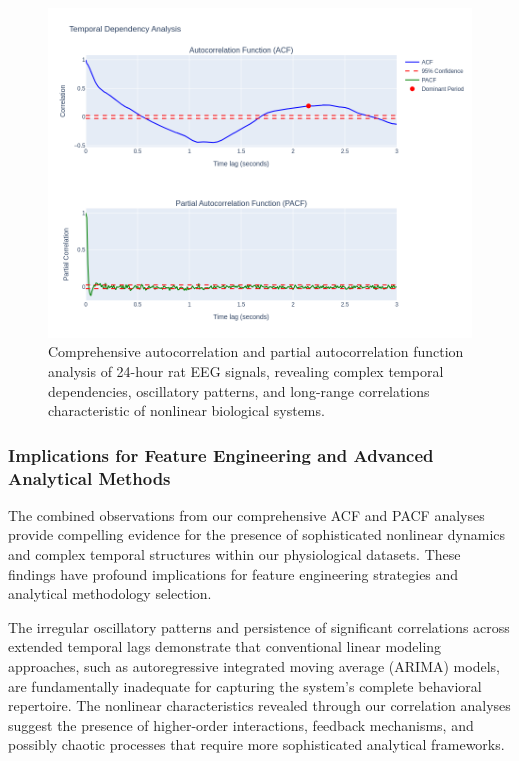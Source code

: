 \documentclass[a4paper,12pt,twoside]{article}
\begin{document}
\begin{figure}[h]
    \centering
    \includegraphics[width=0.95\linewidth]{img/temporal dependency analysis acf pacf.png}
    \caption{Comprehensive autocorrelation and partial autocorrelation function analysis of 24-hour rat EEG signals, revealing complex temporal dependencies, oscillatory patterns, and long-range correlations characteristic of nonlinear biological systems.}
    \label{fig:acf_pacf_analysis}
\end{figure}

\subsubsection{Implications for Feature Engineering and Advanced Analytical Methods}  

The combined observations from our comprehensive ACF and PACF analyses provide compelling evidence for the presence of sophisticated nonlinear dynamics and complex temporal structures within our physiological datasets. These findings have profound implications for feature engineering strategies and analytical methodology selection.

The irregular oscillatory patterns and persistence of significant correlations across extended temporal lags demonstrate that conventional linear modeling approaches, such as autoregressive integrated moving average (ARIMA) models, are fundamentally inadequate for capturing the system's complete behavioral repertoire. The nonlinear characteristics revealed through our correlation analyses suggest the presence of higher-order interactions, feedback mechanisms, and possibly chaotic processes that require more sophisticated analytical frameworks.
\end{document}
